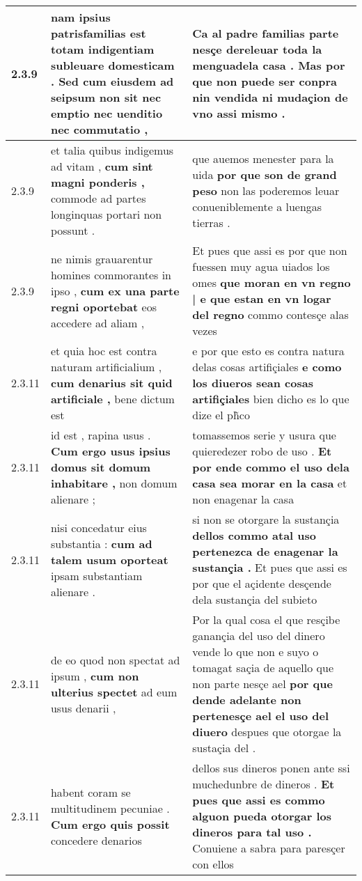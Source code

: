 \begin{tabular}{|p{1cm}|p{6.5cm}|p{6.5cm}|}
2.3.9 & nam ipsius patrisfamilias est totam indigentiam subleuare domesticam . \textbf{ Sed cum eiusdem ad seipsum non sit } nec emptio nec uenditio nec commutatio , & Ca al padre familias parte nesçe dereleuar toda la menguadela casa . \textbf{ Mas por que non puede ser conpra } nin vendida ni mudaçion de vno assi mismo . \\\hline
2.3.9 & et talia quibus indigemus ad vitam , \textbf{ cum sint magni ponderis , } commode ad partes longinquas portari non possunt . & que auemos menester para la uida \textbf{ por que son de grand peso } non las poderemos leuar conueniblemente a luengas tierras . \\\hline
2.3.9 & ne nimis grauarentur homines commorantes in ipso , \textbf{ cum ex una parte regni oportebat } eos accedere ad aliam , & Et pues que assi es por que non fuessen muy agua uiados los omes \textbf{ que moran en vn regno | e que estan en vn logar del regno } commo contesçe alas vezes \\\hline
2.3.11 & et quia hoc est contra naturam artificialium , \textbf{ cum denarius sit quid artificiale , } bene dictum est & e por que esto es contra natura delas cosas artifiçiales \textbf{ e como los diueros sean cosas artifiçiales } bien dicho es lo que dize el ph̃co \\\hline
2.3.11 & id est , rapina usus . \textbf{ Cum ergo usus ipsius domus sit domum inhabitare , } non domum alienare ; & tomassemos serie y usura que quieredezer robo de uso . \textbf{ Et por ende commo el uso dela casa sea morar en la casa } et non enagenar la casa \\\hline
2.3.11 & nisi concedatur eius substantia : \textbf{ cum ad talem usum oporteat } ipsam substantiam alienare . & si non se otorgare la sustançia \textbf{ dellos commo atal uso pertenezca de enagenar la sustançia . } Et pues que assi es por que el açidente desçende dela sustançia del subieto \\\hline
2.3.11 & de eo quod non spectat ad ipsum , \textbf{ cum non ulterius spectet } ad eum usus denarii , & Por la qual cosa el que resçibe ganançia del uso del dinero vende lo que non e suyo o tomagat saçia de aquello que non parte nesçe ael \textbf{ por que dende adelante non pertenesçe ael el uso del diuero } despues que otorgae la sustaçia del . \\\hline
2.3.11 & habent coram se multitudinem pecuniae . \textbf{ Cum ergo quis possit } concedere denarios & dellos sus dineros ponen ante ssi muchedunbre de dineros . \textbf{ Et pues que assi es commo alguon pueda otorgar los dineros para tal uso . } Conuiene a sabra para paresçer con ellos \\\hline

\end{tabular}
